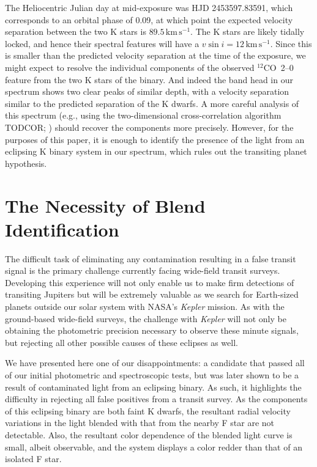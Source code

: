 The Heliocentric Julian day at mid-exposure was HJD 2453597.83591,
which corresponds to an orbital phase of 0.09, at which point the
expected velocity separation between the two K stars is
$89.5\,\mathrm{km\,s^{-1}}$.  The K stars are likely tidally locked,
and hence their spectral features will have a $v \sin{i} =
12\,\mathrm{km\,s^{-1}}$. Since this is smaller than the predicted
velocity separation at the time of the exposure, we might expect to
resolve the individual components of the observed \mbox{$^{12}$CO 2--0} feature
from the two K stars of the binary. And indeed the band head in our
spectrum shows two clear peaks of similar depth, with a velocity
separation similar to the predicted separation of the K dwarfs. A more
careful analysis of this spectrum (e.g., using the two-dimensional cross-correlation algorithm TODCOR;
\citealt{Zucker_Mazeh:apj:1994a}) should recover the components more
precisely. However, for the purposes of this paper, it is enough to
identify the presence of the light from an eclipsing K binary system
in our spectrum, which rules out the transiting planet hypothesis.

\section{The Necessity of Blend Identification}
\label{cha:gsc:sec:dis}

The difficult task of eliminating any contamination resulting in a
false transit signal is the primary challenge currently facing wide-field transit surveys. Developing this experience will not only enable
us to make firm detections of transiting Jupiters but will be
extremely valuable as we search for Earth-sized planets outside our
solar system with NASA's {\it Kepler} mission. As with the
ground-based wide-field surveys, the challenge with {\it Kepler} will not
only be obtaining the photometric precision necessary to observe these
minute signals, but rejecting all other possible causes of these
eclipses as well. 

We have presented here one of our disappointments: a candidate that
passed all of our initial photometric and spectroscopic tests, but was
later shown to be a result of contaminated light from an eclipsing
binary. As such, it highlights the difficulty in rejecting all false
positives from a transit survey. As the components of this eclipsing
binary are both faint K dwarfs, the resultant radial velocity
variations in the light blended with that from the nearby F star are
not detectable. Also, the resultant color dependence of the blended
light curve is small, albeit observable, and the system displays a
color redder than that of an isolated F star.

